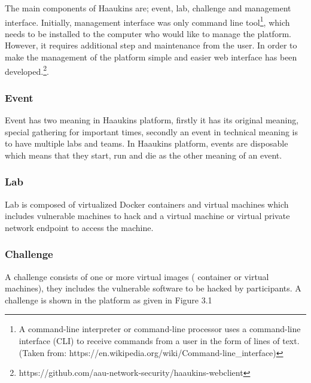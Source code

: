  The main components of Haaukins are; event, lab, challenge and management interface. Initially, management interface was only command line tool\footnote{A command-line interpreter or command-line processor uses a command-line interface (CLI) to receive commands from a user in the form of lines of text. (Taken from: https://en.wikipedia.org/wiki/Command-line_interface)}, which needs to be installed to the computer who would like to manage the platform. However, it requires additional step and maintenance from the user. In order to make the management of the platform simple and easier web interface has been developed.\footnote{https://github.com/aau-network-security/haaukins-webclient}. 
 \subsubsection{Event}
 Event has two meaning in Haaukins platform, firstly it has its original meaning, special gathering for important times, secondly an event  in technical meaning is to have multiple labs and teams. In Haaukins platform, events are disposable which means that they start, run and die as the other meaning of an event. 
 
 \subsubsection{Lab}
 Lab is composed of virtualized Docker containers and virtual machines which includes vulnerable machines to hack and a virtual machine or virtual private network endpoint to access the machine. 
 
 \subsubsection{Challenge}
 A challenge consists of one or more virtual images ( container or virtual machines), they includes the vulnerable software to be hacked by participants. A challenge is shown in the platform as given in Figure 3.1
 
